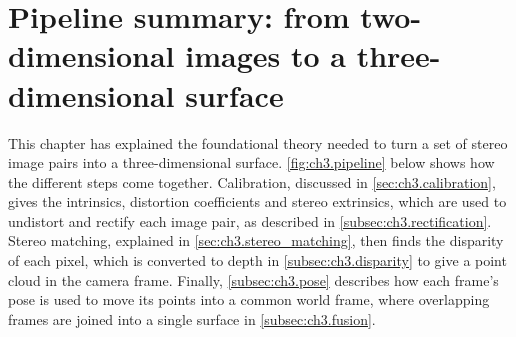 \section[Pipeline summary]{Pipeline summary: from two-dimensional images to a three-dimensional surface}
\label{sec:ch3.pipeline_summary}
This chapter has explained the foundational theory needed to turn a set of stereo
 image pairs into a three-dimensional surface. 
\autoref{fig:ch3.pipeline} below shows how the different steps come together.
 Calibration, discussed in \autoref{sec:ch3.calibration}, gives the
intrinsics, distortion coefficients and stereo extrinsics, which are 
used to undistort and rectify each image pair, as described in \autoref{subsec:ch3.rectification}. Stereo matching, explained in \autoref{sec:ch3.stereo_matching}, then finds the disparity of
each pixel, which is converted to depth in \autoref{subsec:ch3.disparity}
to give a point cloud in the camera frame.
Finally, \autoref{subsec:ch3.pose} describes how each frame's pose is used to move its points 
into a common world frame, where overlapping
frames are joined into a single surface in \autoref{subsec:ch3.fusion}.

